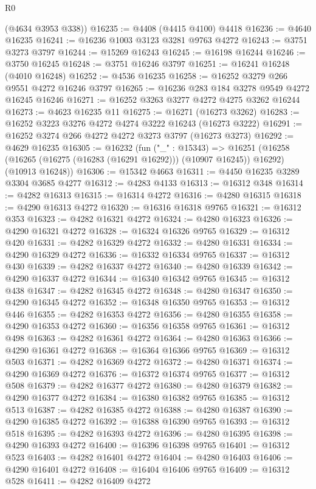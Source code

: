 \begin{lexlean}{R0}
\begin{coremodule}
      (@4634 @3953 @338))
@16235 := @4408 (@4415 @4100) @4418
@16236 := @4640 @16235
@16241 := @16236 @1003 @3123 @3281 @9763 @4272
@16243 := @3751 @3273 @3797
@16244 := @15269 @16243
@16245 := @16198 @16244
@16246 := @3750 @16245
@16248 := @3751 @16246 @3797
@16251 := @16241 @16248 (@4010 @16248)
@16252 := @4536 @16235
@16258 := @16252 @3279 @266 @9551 @4272 @16246 @3797
@16265 := @16236 @283 @184 @3278 @9549 @4272 @16245 @16246
@16271 := @16252 @3263 @3277 @4272 @4275 @3262 @16244
@16273 := @4623 @16235 @11
@16275 := @16271 (@16273 @3262)
@16283 := @16252 @3223 @3276 @4272 @4274 @3222 @16243 (@16273 @3222)
@16291 := @16252 @3274 @266 @4272 @4272 @3273 @3797 (@16273 @3273)
@16292 := @4629 @16235
@16305 := @16232
    (fun ("_" : @15343) =>
    @16251
      (@16258 (@16265 (@16275 (@16283 (@16291 @16292))) (@10907 @16245)) @16292)
      (@10913 @16248))
@16306 := @15342 @4663
@16311 := @4450 @16235 @3289 @3304 @3685 @4277
@16312 := @4283 @4133
@16313 := @16312 @348
@16314 := @4282 @16313
@16315 := @16314 @4272
@16316 := @4280 @16315
@16318 := @4290 @16313 @4272
@16320 := @16316 @16318 @9765
@16321 := @16312 @353
@16323 := @4282 @16321 @4272
@16324 := @4280 @16323
@16326 := @4290 @16321 @4272
@16328 := @16324 @16326 @9765
@16329 := @16312 @420
@16331 := @4282 @16329 @4272
@16332 := @4280 @16331
@16334 := @4290 @16329 @4272
@16336 := @16332 @16334 @9765
@16337 := @16312 @430
@16339 := @4282 @16337 @4272
@16340 := @4280 @16339
@16342 := @4290 @16337 @4272
@16344 := @16340 @16342 @9765
@16345 := @16312 @438
@16347 := @4282 @16345 @4272
@16348 := @4280 @16347
@16350 := @4290 @16345 @4272
@16352 := @16348 @16350 @9765
@16353 := @16312 @446
@16355 := @4282 @16353 @4272
@16356 := @4280 @16355
@16358 := @4290 @16353 @4272
@16360 := @16356 @16358 @9765
@16361 := @16312 @498
@16363 := @4282 @16361 @4272
@16364 := @4280 @16363
@16366 := @4290 @16361 @4272
@16368 := @16364 @16366 @9765
@16369 := @16312 @503
@16371 := @4282 @16369 @4272
@16372 := @4280 @16371
@16374 := @4290 @16369 @4272
@16376 := @16372 @16374 @9765
@16377 := @16312 @508
@16379 := @4282 @16377 @4272
@16380 := @4280 @16379
@16382 := @4290 @16377 @4272
@16384 := @16380 @16382 @9765
@16385 := @16312 @513
@16387 := @4282 @16385 @4272
@16388 := @4280 @16387
@16390 := @4290 @16385 @4272
@16392 := @16388 @16390 @9765
@16393 := @16312 @518
@16395 := @4282 @16393 @4272
@16396 := @4280 @16395
@16398 := @4290 @16393 @4272
@16400 := @16396 @16398 @9765
@16401 := @16312 @523
@16403 := @4282 @16401 @4272
@16404 := @4280 @16403
@16406 := @4290 @16401 @4272
@16408 := @16404 @16406 @9765
@16409 := @16312 @528
@16411 := @4282 @16409 @4272

\end{coremodule}
\end{lexlean}
